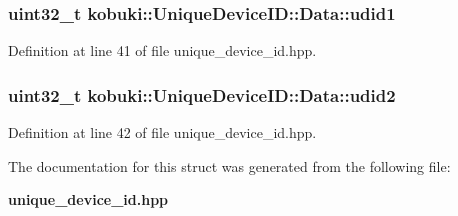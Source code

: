 \subsubsection[{udid1}]{\setlength{\rightskip}{0pt plus 5cm}uint32\-\_\-t {\bf kobuki\-::\-Unique\-Device\-I\-D\-::\-Data\-::udid1}}\label{structkobuki_1_1UniqueDeviceID_1_1Data_a4839939a73f3e7d47f52b7399f6d8047}


\-Definition at line 41 of file unique\-\_\-device\-\_\-id.\-hpp.

\subsubsection[{udid2}]{\setlength{\rightskip}{0pt plus 5cm}uint32\-\_\-t {\bf kobuki\-::\-Unique\-Device\-I\-D\-::\-Data\-::udid2}}\label{structkobuki_1_1UniqueDeviceID_1_1Data_ad8c475aafccda342e444fb6797a53de4}


\-Definition at line 42 of file unique\-\_\-device\-\_\-id.\-hpp.



\-The documentation for this struct was generated from the following file\-:\begin{DoxyCompactItemize}
\item 
{\bf unique\-\_\-device\-\_\-id.\-hpp}\end{DoxyCompactItemize}
